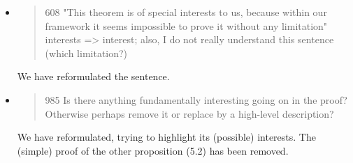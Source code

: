 \begin{itemize}




  \item \begin{quote}
608 "This theorem is of special interests to us, because within our framework it seems impossible to prove it without any limitation" interests => interest; also, I do not really understand this sentence (which limitation?)
\end{quote}
  \Mark We have reformulated the sentence. 


  \item \begin{quote}
985 Is there anything fundamentally interesting going on in the proof? Otherwise perhaps remove it or replace by a high-level description?
\end{quote}
  \Mark 
We have reformulated, trying to highlight its (possible)
interests. The (simple) proof of the other proposition (5.2) has been removed.



\end{itemize}
